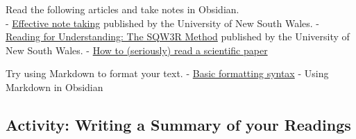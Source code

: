 \documentclass[
]{book}
\theoremstyle{definition}
\theoremstyle{definition}
\theoremstyle{definition}
\theoremstyle{definition}
\theoremstyle{remark}
\begin{document}
\begin{reflect}
Read the following articles and take notes in Obsidian.\\
- \href{https://www.student.unsw.edu.au/effective-reading-and-note-taking}{Effective note taking} published by the University of New South Wales.
- \href{https://www.student.unsw.edu.au/reading-understanding}{Reading for Understanding: The SQW3R Method} published by the University of New South Wales.
- \href{https://www.science.org/content/article/how-seriously-read-scientific-paper}{How to (seriously) read a scientific paper}

Try using Markdown to format your text.
- \href{https://help.obsidian.md/Editing+and+formatting/Basic+formatting+syntax}{Basic formatting syntax} - Using Markdown in Obsidian
\end{reflect}

\hypertarget{activity-writing-a-summary-of-your-readings}{%
\subsection*{Activity: Writing a Summary of your Readings}\label{activity-writing-a-summary-of-your-readings}}
\end{document}
